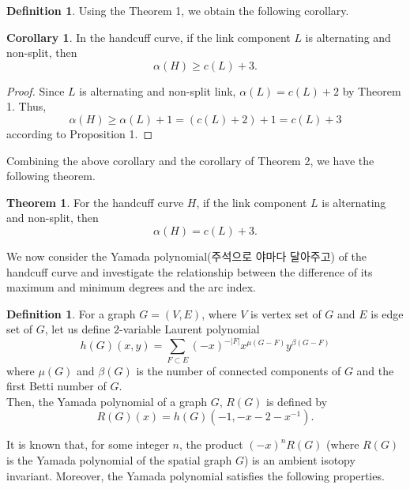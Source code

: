 \documentclass{article}
\theoremstyle{definition}
\newtheorem{defn}[thm]{Definition}
\theoremstyle{theorem}
\newtheorem{theorem}{Theorem}
\theoremstyle{proposition}
\theoremstyle{corollary}
\newtheorem*{corol}{Corollary}
\begin{document}
\begin{defn}
Using the Theorem 1, we obtain the following corollary.

\begin{corol}
    In the handcuff curve, if the link component $L$ is alternating and non-split, then
    \[ \alpha(H) \geq c(L)+3. \]
\end{corol}

\begin{proof}
    Since $L$ is alternating and non-split link, $\alpha(L)=c(L)+2$ by Theorem 1. Thus, \[\alpha(H) \geq \alpha(L)+1 = \left( c(L)+2 \right)+1 = c(L)+3\] according to Proposition 1.
\end{proof}

Combining the above corollary and the corollary of Theorem 2, we have the following theorem.

\begin{theorem}
    For the handcuff curve $H$, if the link component $L$ is alternating and non-split, then
    \[ \alpha(H) = c(L)+3. \]
\end{theorem}

We now consider the Yamada polynomial(주석으로 야마다 달아주고) of the handcuff curve and investigate the relationship between the difference of its maximum and minimum degrees and the arc index.

\begin{defn}
    For a graph $G=(V, E)$, where $V$ is vertex set of $G$ and $E$ is edge set of $G$, let us define $2$-variable Laurent polynomial
    \[ h(G)(x, y) = \sum_{F \subset E} (-x)^{-|F|} x^{\mu(G-F)} y^{\beta(G-F)} \]
    where $\mu(G)$ and $\beta(G)$ is the number of connected components of $G$ and the first Betti number of $G$. \\
    Then, the Yamada polynomial of a graph $G$, $R(G)$ is defined by
    \[ R(G)(x) = h(G)(-1, -x-2-x^{-1}). \]
\end{defn}

It is known that, for some integer $n$, the product $(-x)^n R(G)$ (where $R(G)$ is the Yamada polynomial of the spatial graph $G$) is an ambient isotopy invariant. Moreover, the Yamada polynomial satisfies the following properties.


\end{defn}
\end{document}
